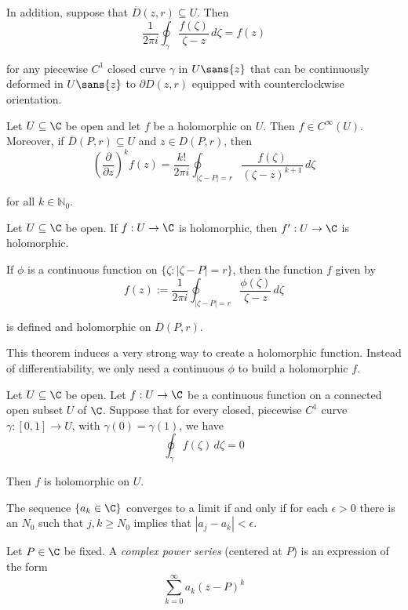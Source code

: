 In addition, suppose that $\overline D(z,r)\subseteq U$. Then
$$
  \frac1{2\pi i}\oint_\gamma\frac{f(\zeta)}{\zeta-z}\,d\zeta=f(z)
$$

for any piecewise $C^1$ closed curve $\gamma$ in $U\sans{z}$ that can be
continuously deformed in $U\sans{z}$ to $\partial D(z,r)$ equipped with
counterclockwise orientation.

\label{e20a4ed}

Let $U\subseteq\C$ be open and let $f$ be a holomorphic on $U$. Then $f\in
C^\infty(U)$. Moreover, if $\overline D(P,r)\subseteq U$ and $z\in D(P,r)$,
then
$$
  \left(\frac\partial{\partial z}\right)^kf(z)=\frac{k!}{2\pi i}
  \oint_{|\zeta-P|=r}\frac{f(\zeta)}{(\zeta-z)^{k+1}}\,d\zeta
$$

for all $k\in\mathbb{N}_0$.

\label{ee189cf}

Let $U\subseteq\C$ be open. If $f:U\to\C$ is holomorphic, then $f':U\to\C$ is
holomorphic.

\Theorem{}\label{c056da0}

If $\phi$ is a continuous function on $\{\zeta:|\zeta-P|=r\}$, then the
function $f$ given by
$$
  f(z):=\frac1{2\pi i}\oint_{|\zeta-P|=r}\frac{\phi(\zeta)}{\zeta-z}\,d\zeta
$$

is defined and holomorphic on $D(P,r)$.

This theorem induces a very strong way to create a holomorphic function.
Instead of differentiability, we only need a continuous $\phi$ to build a
holomorphic $f$.

\label{f378992}

Let $U\subseteq\C$ be open. Let $f:U\to\C$ be a continuous function on a
connected open subset $U$ of $\C$. Suppose that for every closed, piecewise
$C^1$ curve $\gamma:[0,1]\to U$, with $\gamma(0)=\gamma(1)$, we have
$$
  \oint_\gamma f(\zeta)\,d\zeta=0
$$

Then $f$ is holomorphic on $U$.

\Lemma{}\label{db44655}

The sequence $\{a_k\in\C\}$ converges to a limit if and only if for each
$\epsilon>0$ there is an $N_0$ such that $j,k\geq N_0$ implies that
$|a_j-a_k|<\epsilon$.

\label{b9a7c59}

Let $P\in\C$ be fixed. A \textit{complex power series} (centered at $P$) is an
expression of the form
$$
  \sum_{k=0}^\infty a_k(z-P)^k
$$

